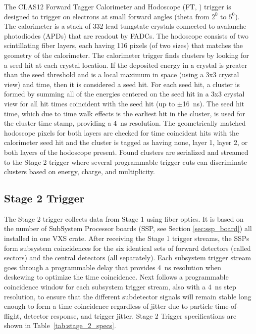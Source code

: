 The CLAS12 Forward Tagger Calorimeter and Hodoscope (FT, \cite{ft-ref}) trigger is designed to trigger on electrons at small forward angles (theta from $2^0$  to $5^0$). The calorimeter is a stack of 332 lead tungstate crystals connected to avalanche photodiodes (APDs) that are readout by FADCs. The hodoscope consists of two scintillating fiber layers, each having 116 pixels (of two sizes) that matches the geometry of the calorimeter. The calorimeter trigger finds clusters by looking for a seed hit at each crystal location. If the deposited energy in a crystal is greater than the seed threshold and is a local maximum in space (using a 3x3 crystal view) and time, then it is considered a seed hit. For each seed hit, a cluster is formed by summing all of the energies centered on the seed hit in a 3x3 crystal view for all hit times coincident with the seed hit (up to $\pm$16~ns). The seed hit time, which due to time walk effects is the earliest hit in the cluster, is used for the cluster time stamp, providing a 4~ns resolution. The geometrically matched hodoscope pixels for both layers are checked for time coincident hits with the calorimeter seed hit and the cluster is tagged as having none, layer 1, layer 2, or both layers of the hodoscope present. Found clusters are serialized and streamed to the Stage 2 trigger where several programmable trigger cuts can discriminate clusters based on energy, charge, and multiplicity.


\subsection{Stage 2 Trigger}

The Stage 2 trigger collects data from Stage 1 using fiber optics. It is based on the number of SubSystem Processor boards (SSP, see Section \ref*{sec:ssp_board}) all installed in one VXS crate. After receiving the Stage 1 trigger streams, the SSPs form subsystem coincidences for the six identical sets of forward detectors (called sectors) and the central detectors (all separately). Each subsystem trigger stream goes through a programmable delay that provides 4~ns resolution when deskewing to optimize the time coincidence. Next follows a programmable coincidence window for each subsystem trigger stream, also with a 4~ns step resolution, to ensure that the different subdetector signals will remain stable long enough to form a time coincidence regardless of jitter due to particle time-of-flight, detector response, and trigger jitter. Stage 2 Trigger specifications are shown in Table~\ref{tab:stage_2_specs}.

